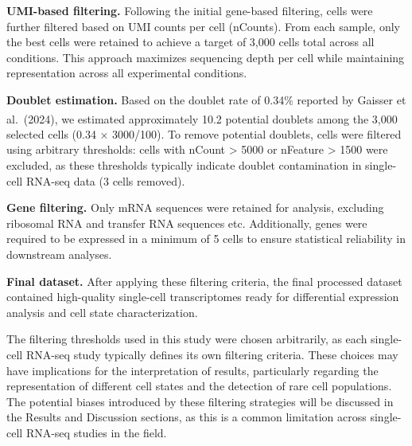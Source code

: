 \documentclass[
  11pt,
  a4paper,
]{report}
\begin{document}
\textbf{UMI-based filtering.} Following the initial gene-based
filtering, cells were further filtered based on UMI counts per cell
(nCounts). From each sample, only the best cells were retained to
achieve a target of 3,000 cells total across all conditions. This
approach maximizes sequencing depth per cell while maintaining
representation across all experimental conditions.

\textbf{Doublet estimation.} Based on the doublet rate of 0.34\%
reported by Gaisser et
al.~(2024)\textsuperscript{}, we estimated
approximately 10.2 potential doublets among the 3,000 selected cells
(0.34 × 3000/100). To remove potential doublets, cells were filtered
using arbitrary thresholds: cells with nCount \textgreater{} 5000 or
nFeature \textgreater{} 1500 were excluded, as these thresholds
typically indicate doublet contamination in single-cell RNA-seq data (3
cells removed).

\textbf{Gene filtering.} Only mRNA sequences were retained for analysis,
excluding ribosomal RNA and transfer RNA sequences etc. Additionally,
genes were required to be expressed in a minimum of 5 cells to ensure
statistical reliability in downstream analyses.

\textbf{Final dataset.} After applying these filtering criteria, the
final processed dataset contained high-quality single-cell
transcriptomes ready for differential expression analysis and cell state
characterization.

\begin{tcolorbox}[enhanced jigsaw, arc=.35mm, colbacktitle=quarto-callout-warning-color!10!white, rightrule=.15mm, title=\textcolor{quarto-callout-warning-color}{\faExclamationTriangle}\hspace{0.5em}{Warning}, coltitle=black, bottomrule=.15mm, left=2mm, opacityback=0, colback=white, toprule=.15mm, toptitle=1mm, titlerule=0mm, breakable, bottomtitle=1mm, opacitybacktitle=0.6, colframe=quarto-callout-warning-color-frame, leftrule=.75mm]

The filtering thresholds used in this study were chosen arbitrarily, as
each single-cell RNA-seq study typically defines its own filtering
criteria. These choices may have implications for the interpretation of
results, particularly regarding the representation of different cell
states and the detection of rare cell populations. The potential biases
introduced by these filtering strategies will be discussed in the
Results and Discussion sections, as this is a common limitation across
single-cell RNA-seq studies in the field.

\end{tcolorbox}
\end{document}
